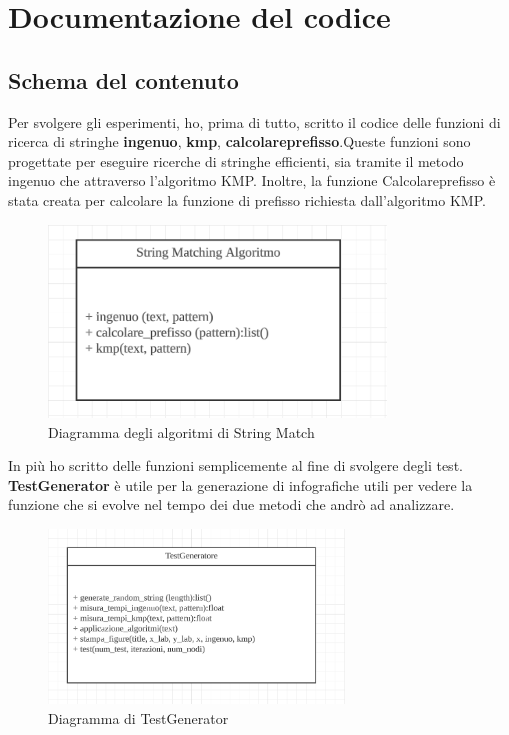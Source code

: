 \newpage
\section{Documentazione del codice}

\subsection{Schema del contenuto}
\label{sec:SchemaContenuto_1}
Per svolgere gli esperimenti, ho, prima di tutto, scritto il codice delle funzioni di ricerca di stringhe \textbf{ingenuo}, \textbf{kmp}, \textbf{calcolareprefisso}.Queste funzioni sono progettate per eseguire ricerche di stringhe efficienti, sia tramite il metodo ingenuo che attraverso l'algoritmo KMP. Inoltre, la funzione Calcolareprefisso è stata creata per calcolare la funzione di prefisso richiesta dall'algoritmo KMP.

\begin{figure}[H]
    \centering
    \includegraphics[width=0.8\textwidth]{Resources/string_match.png}
    \caption{Diagramma degli algoritmi di String Match}
    \label{fig:Ingenuo_Kmp_1}
\end{figure}

In più ho scritto delle funzioni semplicemente al fine di svolgere degli test. \textbf{TestGenerator} è utile per la generazione di infografiche utili per vedere la funzione che si evolve nel tempo dei due metodi che andrò ad analizzare.

\begin{figure}[H]
    \centering
    \includegraphics[width=0.7\textwidth]{Resources/testgeneratore.png}
    \caption{Diagramma di TestGenerator}
    \label{fig:TestGenerator_1}
\end{figure}

